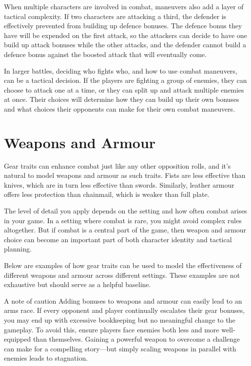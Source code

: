 \begin{multicols}{2}
When multiple characters are involved in combat, maneuvers also add a layer of tactical complexity. If two characters are attacking a third, the defender is effectively prevented from building up defence bonuses. The defence bonus they have will be expended on the first attack, so the attackers can decide to have one build up attack bonuses while the other attacks, and the defender cannot build a defence bonus against the boosted attack that will eventually come.

In larger battles, deciding who fights who, and how to use combat maneuvers, can be a tactical decision. If the players are fighting a group of enemies, they can choose to attack one at a time, or they can split up and attack multiple enemies at once. Their choices will determine how they can build up their own bonuses and what choices their opponents can make for their own combat maneuvers.

\section{Weapons and Armour}

Gear traits can enhance combat just like any other opposition rolls, and it’s natural to model weapons and armour as such traits. Fists are less effective than knives, which are in turn less effective than swords. Similarly, leather armour offers less protection than chainmail, which is weaker than full plate.

The level of detail you apply depends on the setting and how often combat arises in your game. In a setting where combat is rare, you might avoid complex rules altogether. But if combat is a central part of the game, then weapon and armour choice can become an important part of both character identity and tactical planning.

Below are examples of how gear traits can be used to model the effectiveness of different weapons and armour across different settings. These examples are not exhaustive but should serve as a helpful baseline. 

\begin{CommentBox}{A note of caution}
    Adding bonuses to weapons and armour can easily lead to an arms race. If every opponent and player continually escalates their gear bonuses, you may end up with excessive bookkeeping but no meaningful change to the gameplay. To avoid this, ensure players face enemies both less and more well-equipped than themselves. Gaining a powerful weapon to overcome a challenge can make for a compelling story—but simply scaling weapons in parallel with enemies leads to stagnation.
\end{CommentBox}


\end{multicols}
